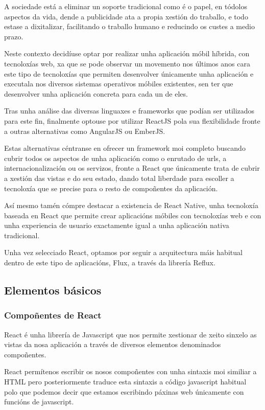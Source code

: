     A sociedade está a eliminar un soporte tradicional como é o papel, en 
tódolos aspectos da vida, dende a publicidade ata a propia xestión do traballo, 
e todo estase a dixitalizar, facilitando o traballo humano e reducindo os custes 
a medio prazo.

    Neste contexto decidíuse optar por realizar unha aplicación móbil 
híbrida, con tecnoloxías web, xa que se pode observar un movemento nos últimos 
anos cara este tipo de tecnoloxías que permiten desenvolver únicamente unha 
aplicación e executala nos diversos sistemas operativos móbiles existentes, sen 
ter que desenvolver unha aplicación concreta para cada un de eles.

    Tras unha análise das diversas linguaxes e frameworks que podían 
ser utilizados para este fin, finalmente optouse por utilizar ReactJS pola sua 
flexibilidade fronte a outras alternativas como AngularJS ou EmberJS.

    Estas alternativas céntranse en ofrecer un framework moi completo buscando 
cubrir todos os aspectos de unha aplicación como o enrutado 
de urls, a internacionalización ou os servizos, fronte a React que únicamente 
trata de cubrir a xestión das vistas e do seu estado, dando total liberdade 
para escoller a tecnoloxía que se precise para o resto de compoñentes da 
aplicación.

    Así mesmo tamén cómpre destacar a existencia de React Native, unha 
tecnoloxía baseada en React que permite crear aplicacións móbiles con 
tecnoloxías web e con unha experiencia de usuario exactamente igual a unha 
aplicación nativa tradicional.

    Unha vez selecciado React, optamos por seguir a arquitectura máis habitual 
dentro de este tipo de aplicacións, Flux, a través da librería Reflux.

    \subsection{Elementos básicos}
      \subsubsection{Compoñentes de React}
      React é unha librería de Javascript que nos permite xestionar de xeito 
sinxelo as vistas da nosa aplicación a través de diversos elementos denominados 
compoñentes.

      React permítenos escribir os nosos compoñentes con unha sintaxis moi 
similiar a HTML pero posteriormente traduce esta sintaxis a código javascript 
habitual polo que podemos decir que estamos escribindo páxinas web únicamente 
con funcións de javascript.

